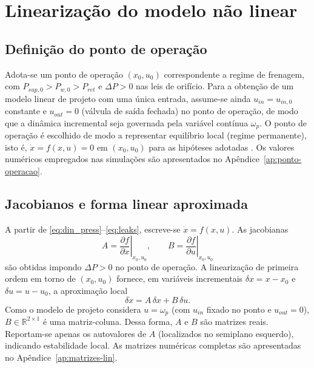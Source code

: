 \section{Linearização do modelo não linear}
\label{sec:controle-linearizacao-2p}



\subsection{Definição do ponto de operação}
\label{sec:definicao-ponto-operacao}
Adota-se um ponto de operação $(x_0,u_0)$ correspondente a regime de frenagem, com $P_{sup,0}>P_{w,0}>P_{ret}$ e $\Delta P>0$ nas leis de orifício. Para a obtenção de um modelo linear de projeto com uma única entrada, assume-se ainda $u_{in}=u_{in,0}$ constante e $u_{out}=0$ (válvula de saída fechada) no ponto de operação, de modo que a dinâmica incremental seja governada pela variável contínua $\omega_p$. O ponto de operação é escolhido de modo a representar equilíbrio local (regime permanente), isto é, $\dot{x}=f(x,u)=0$ em $(x_0,u_0)$ para as hipóteses adotadas \cite{FranklinPowellWorkman1998,Ogata1997}. Os valores numéricos empregados nas simulações são apresentados no Apêndice~\ref{ap:ponto-operacao}.
\subsection{Jacobianos e forma linear aproximada}
\label{sec:derivacao-matrizes-jacobianas}
A partir de \eqref{eq:din_press}–\eqref{eq:leaks}, escreve-se $\dot{x}=f(x,u)$. As jacobianas
\[
    A=\left.\frac{\partial f}{\partial x}\right|_{x_0,u_0},
    \qquad
    B=\left.\frac{\partial f}{\partial u}\right|_{x_0,u_0}
\]
são obtidas impondo $\Delta P>0$ no ponto de operação. A linearização de primeira ordem em torno de $(x_0,u_0)$ fornece, em variáveis incrementais $\delta x = x-x_0$ e $\delta u = u-u_0$, a aproximação local
\[
    \delta\dot{x} = A\,\delta x + B\,\delta u.
\]
Como o modelo de projeto considera $u=\omega_p$ (com $u_{in}$ fixado no ponto e $u_{out}=0$), $B\in\mathbb{R}^{2\times 1}$ é uma matriz-coluna. Dessa forma, $A$ e $B$ são matrizes reais. Reportam-se apenas os autovalores de $A$ (localizados no semiplano esquerdo), indicando estabilidade local. As matrizes numéricas completas são apresentadas no Apêndice~\ref{ap:matrizes-lin}.
